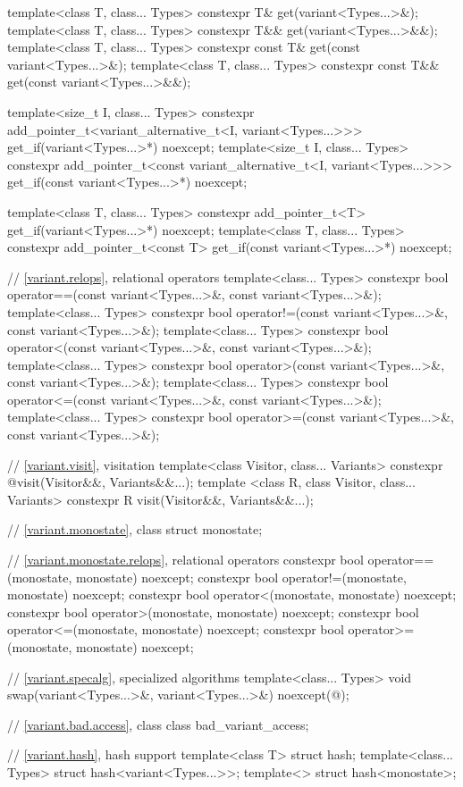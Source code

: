 \begin{codeblock}
{  template<class T, class... Types>
    constexpr T& get(variant<Types...>&);
  template<class T, class... Types>
    constexpr T&& get(variant<Types...>&&);
  template<class T, class... Types>
    constexpr const T& get(const variant<Types...>&);
  template<class T, class... Types>
    constexpr const T&& get(const variant<Types...>&&);

  template<size_t I, class... Types>
    constexpr add_pointer_t<variant_alternative_t<I, variant<Types...>>>
      get_if(variant<Types...>*) noexcept;
  template<size_t I, class... Types>
    constexpr add_pointer_t<const variant_alternative_t<I, variant<Types...>>>
      get_if(const variant<Types...>*) noexcept;

  template<class T, class... Types>
    constexpr add_pointer_t<T>
      get_if(variant<Types...>*) noexcept;
  template<class T, class... Types>
    constexpr add_pointer_t<const T>
      get_if(const variant<Types...>*) noexcept;

  // \ref{variant.relops}, relational operators
  template<class... Types>
    constexpr bool operator==(const variant<Types...>&, const variant<Types...>&);
  template<class... Types>
    constexpr bool operator!=(const variant<Types...>&, const variant<Types...>&);
  template<class... Types>
    constexpr bool operator<(const variant<Types...>&, const variant<Types...>&);
  template<class... Types>
    constexpr bool operator>(const variant<Types...>&, const variant<Types...>&);
  template<class... Types>
    constexpr bool operator<=(const variant<Types...>&, const variant<Types...>&);
  template<class... Types>
    constexpr bool operator>=(const variant<Types...>&, const variant<Types...>&);

  // \ref{variant.visit}, visitation
  template<class Visitor, class... Variants>
    constexpr @\seebelow@ visit(Visitor&&, Variants&&...);
  template <class R, class Visitor, class... Variants>
    constexpr R visit(Visitor&&, Variants&&...);

  // \ref{variant.monostate}, class 
  struct monostate;

  // \ref{variant.monostate.relops},  relational operators
  constexpr bool operator==(monostate, monostate) noexcept;
  constexpr bool operator!=(monostate, monostate) noexcept;
  constexpr bool operator<(monostate, monostate) noexcept;
  constexpr bool operator>(monostate, monostate) noexcept;
  constexpr bool operator<=(monostate, monostate) noexcept;
  constexpr bool operator>=(monostate, monostate) noexcept;

  // \ref{variant.specalg}, specialized algorithms
  template<class... Types>
    void swap(variant<Types...>&, variant<Types...>&) noexcept(@\seebelow@);

  // \ref{variant.bad.access}, class 
  class bad_variant_access;

  // \ref{variant.hash}, hash support
  template<class T> struct hash;
  template<class... Types> struct hash<variant<Types...>>;
  template<> struct hash<monostate>;
}
\end{codeblock}

